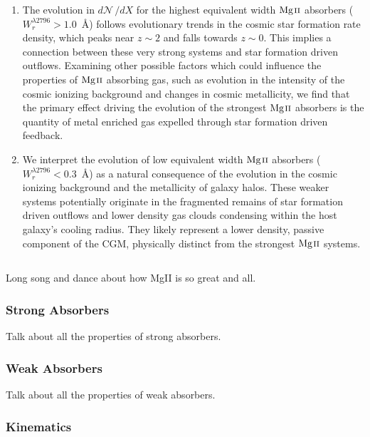 \begin{enumerate}
\item The evolution in $d\mathcal{N}\,/dX$ for the highest equivalent width ${\hbox{{\rm Mg}\kern 0.1em{\sc ii}}}$ absorbers ($W_r^{\lambda2796} > 1.0$~{\AA}) follows evolutionary trends in the cosmic star formation rate density, which peaks near $z \sim 2$ and falls towards $z \sim 0$. This implies a connection between these very strong systems and star formation driven outflows. Examining other possible factors which could influence the properties of ${\hbox{{\rm Mg}\kern 0.1em{\sc ii}}}$ absorbing gas, such as evolution in the intensity of the cosmic ionizing background and changes in cosmic metallicity, we find that the primary effect driving the evolution of the strongest ${\hbox{{\rm Mg}\kern 0.1em{\sc ii}}}$ absorbers is the quantity of metal enriched gas expelled through star formation driven feedback.
\item We interpret the evolution of low equivalent width ${\hbox{{\rm Mg}\kern 0.1em{\sc ii}}}$ absorbers ($W_r^{\lambda2796} < 0.3$~{\AA}) as a natural consequence of the evolution in the cosmic ionizing background and the metallicity of galaxy halos. These weaker systems potentially originate in the fragmented remains of star formation driven outflows and lower density gas clouds condensing within the host galaxy's cooling radius. They likely represent a lower density, passive component of the CGM, physically distinct from the strongest ${\hbox{{\rm Mg}\kern 0.1em{\sc ii}}}$ systems.
\end{enumerate}

\subsection{{\MgII}}
\label{ch8:MgII}

Long song and dance about how MgII is so great and all.

\subsubsection{Strong Absorbers}
\label{ch8:MgIIstrong}

Talk about all the properties of strong absorbers.

\subsubsection{Weak Absorbers}
\label{ch8:MgIIweak}

Talk about all the properties of weak absorbers.

\subsubsection{Kinematics}
\label{ch8:MgIIkinematics}

